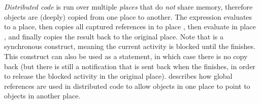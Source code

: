 \emph{Distributed code} is run over multiple \emph{places} that do \emph{not} share memory,
    therefore objects are (deeply) copied from one place to another.
The expression  evaluates  to a place, then copies all captured references in  to place ,
    then evaluate  in place , and finally copies the result back to the original place.
Note that  is a synchronous construct, meaning the current activity is blocked until the  finishes.
This construct can also be used as a statement, in which case there is no copy back
    (but there is still a notification that is sent back when the  finishes, in order to release the blocked activity in the original place).
 describes how global references are used in distributed code
    to allow objects in one place to point to objects in another place.





